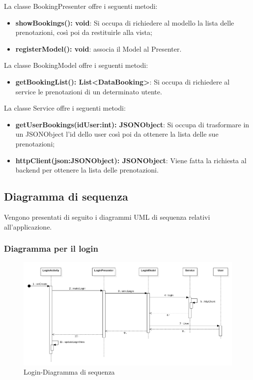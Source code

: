 La classe BookingPresenter offre i seguenti metodi:
\begin{itemize}
	\item \textbf{showBookings(): void}: Si occupa di richiedere al modello la lista delle prenotazioni, così poi da restituirle alla vista; 
	\item \textbf{registerModel(): void}: associa il Model al Presenter.
\end{itemize}

La classe BookingModel offre i seguenti metodi:
\begin{itemize}
	\item \textbf{getBookingList(): List<DataBooking>}: Si occupa di richiedere al service le prenotazioni di un determinato utente. 
\end{itemize}

La classe Service offre i seguenti metodi:
\begin{itemize}
	\item \textbf{getUserBookings(idUser:int): JSONObject}: Si occupa di trasformare in un JSONObject l'id dello user così poi da ottenere la lista delle sue prenotazioni;
	\item \textbf{httpClient(json:JSONObject): JSONObject}: Viene fatta la richiesta al backend per ottenere la lista delle prenotazioni.
 
\end{itemize}

\subsection{Diagramma di sequenza}
Vengono presentati di seguito i diagrammi UML di sequenza relativi all'applicazione.

\subsubsection{Diagramma per il login}
\begin{figure}[H]
	\centering
	\includegraphics[width=16cm]{res/images/loginSeq.png}
	\caption{Login-Diagramma di sequenza}
	\label{fig:Login-Diagramma di sequenza}
\end{figure}

